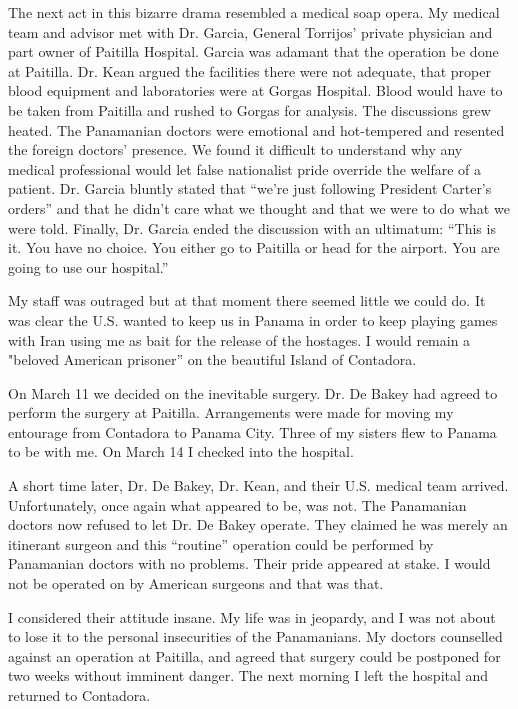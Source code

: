 The next act in this bizarre drama resembled a medical soap opera. My medical team and advisor met with Dr. Garcia, General Torrijos’ private physician and part owner of Paitilla Hospital. Garcia was adamant that the operation be done at Paitilla. Dr. Kean argued the facilities there were not adequate, that proper blood equipment and laboratories were at Gorgas Hospital. Blood would have to be taken from Paitilla and rushed to Gorgas for analysis. The discussions grew heated. The Panamanian doctors were emotional and hot-tempered and resented the foreign doctors’ presence. We found it difficult to understand why any medical professional would let false nationalist pride override the welfare of a patient. Dr. Garcia bluntly stated that “we're just following President Carter's orders” and that he didn't care what we thought and that we were to do what we were told. Finally, Dr. Garcia ended the discussion with an ultimatum: “This is it. You have no choice. You either go to Paitilla or head for the airport. You are going to use our hospital.” 

My staff was outraged but at that moment there seemed little we could do. It was clear the U.S. wanted to keep us in Panama in order to keep playing games with Iran using me as bait for the release of the hostages. I would remain a "beloved American prisoner” on the beautiful Island of Contadora. 

On March 11 we decided on the inevitable surgery. Dr. De Bakey had agreed to perform the surgery at Paitilla. Arrangements were made for moving my entourage from Contadora to Panama City. Three of my sisters flew to Panama to be with me. On March 14 I checked into the hospital. 

A short time later, Dr. De Bakey, Dr. Kean, and their U.S. medical team arrived. Unfortunately, once again what appeared to be, was not. The Panamanian doctors now refused to let Dr. De Bakey operate. They claimed he was merely an itinerant surgeon and this “routine” operation could be performed by Panamanian doctors with no problems. Their pride appeared at stake. I would not be operated on by American surgeons and that was that. 

I considered their attitude insane. My life was in jeopardy, and I was not about to lose it to the personal insecurities of the Panamanians. My doctors counselled against an operation at Paitilla, and agreed that surgery could be postponed for two weeks without imminent danger. The next morning I left the hospital and returned to Contadora. 


